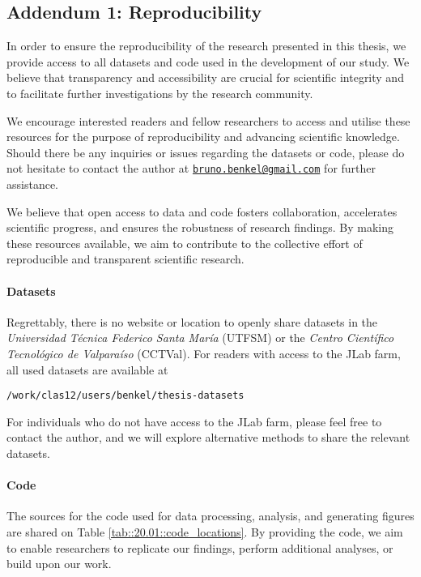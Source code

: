 \subsection*{Addendum 1: Reproducibility}
\label{20.01::reproducibility}
    In order to ensure the reproducibility of the research presented in this thesis, we provide access to all datasets and code used in the development of our study.
    We believe that transparency and accessibility are crucial for scientific integrity and to facilitate further investigations by the research community.

    We encourage interested readers and fellow researchers to access and utilise these resources for the purpose of reproducibility and advancing scientific knowledge.
    Should there be any inquiries or issues regarding the datasets or code, please do not hesitate to contact the author at \href{mailto:bruno.benkel@gmail.com}{\texttt{bruno.benkel@gmail.com}} for further assistance.

    We believe that open access to data and code fosters collaboration, accelerates scientific progress, and ensures the robustness of research findings.
    By making these resources available, we aim to contribute to the collective effort of reproducible and transparent scientific research.

    \paragraph{Datasets}
        Regrettably, there is no website or location to openly share datasets in the \textit{Universidad Técnica Federico Santa María} (UTFSM) or the \textit{Centro Científico Tecnológico de Valparaíso} (CCTVal).
        For readers with access to the JLab farm, all used datasets are available at

        \begin{center}
            \texttt{/work/clas12/users/benkel/thesis-datasets}
        \end{center}

        For individuals who do not have access to the JLab farm, please feel free to contact the author, and we will explore alternative methods to share the relevant datasets.

    \paragraph{Code}
        The sources for the code used for data processing, analysis, and generating figures are shared on Table \ref{tab::20.01::code_locations}.
        By providing the code, we aim to enable researchers to replicate our findings, perform additional analyses, or build upon our work.

